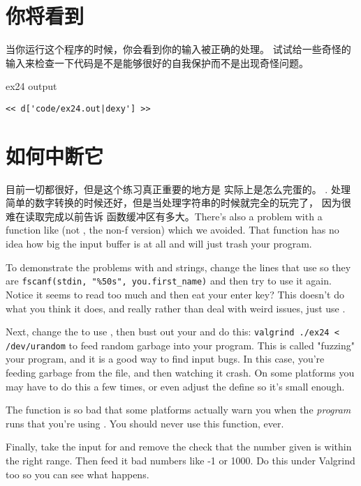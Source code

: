 \section{你将看到}

当你运行这个程序的时候，你会看到你的输入被正确的处理。
试试给一些奇怪的输入来检查一下代码是不是能够很好的自我保护而不是出现奇怪问题。

\begin{code}{ex24 output}
\begin{lstlisting}
<< d['code/ex24.out|dexy'] >>
\end{lstlisting}
\end{code}


\section{如何中断它}

目前一切都很好，但是这个练习真正重要的地方是  实际上是怎么完蛋的。
. 处理简单的数字转换的时候还好，但是当处理字符串的时候就完全的玩完了，
因为很难在读取完成以前告诉 函数缓冲区有多大。There's also a problem with a function like 
(not , the non-f version) which we avoided.  That function has
no idea how big the input buffer is at all and will just trash your program.

To demonstrate the problems with  and strings, change the lines
that use  so they are \verb|fscanf(stdin, "%50s", you.first_name)|
and then try to use it again.  Notice it seems to read too much and then 
eat your enter key?  This doesn't do what you think it does, and really
rather than deal with weird  issues, just use .

Next, change the  to use , then bust out your
 and do this:  \verb|valgrind ./ex24 < /dev/urandom|
to feed random garbage into your program.  This is called "fuzzing"
your program, and it is a good way to find input bugs.  In this case,
you're feeding garbage from the  file, and then watching
it crash.  On some platforms you may have to do this a few times, or even
adjust the  define so it's small enough.

The  function is so bad that some platforms actually warn you
when the \emph{program} runs that you're using .  You should
never use this function, ever.

Finally, take the input for  and remove the check that the
number given is within the right range.  Then feed it bad numbers like -1 or
1000.  Do this under Valgrind too so you can see what happens.

